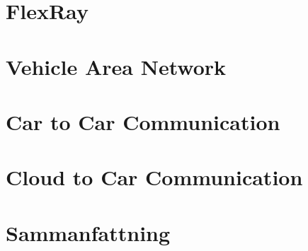 \documentclass[a4paper]{IEEEtran}
\begin{document}
\section{FlexRay}%

\section{Vehicle Area Network}%

\section{Car to Car Communication}

\section{Cloud to Car Communication}

\section{Sammanfattning}



\end{document}
